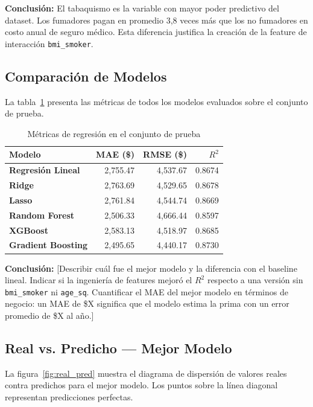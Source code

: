 \documentclass[12pt, a4paper]{article}
\begin{document}
\noindent\textbf{Conclusión:} El tabaquismo es la variable con mayor
poder predictivo del dataset. Los fumadores pagan en promedio 3{,}8 veces
más que los no fumadores en costo anual de seguro médico. Esta diferencia
justifica la creación de la feature de interacción \texttt{bmi\_smoker}.

\subsection{Comparación de Modelos}

La tabla~\ref{tab:resultados} presenta las métricas de todos los modelos
evaluados sobre el conjunto de prueba.

\begin{table}[H]
\centering
\caption{Métricas de regresión en el conjunto de prueba}
\small
\begin{tabular}{>{\bfseries}p{4.2cm} r r r}
\toprule
Modelo & MAE (\$) & RMSE (\$) & $R^2$ \\
\midrule
Regresión Lineal  & 2,755.47 & 4,537.67 & 0.8674 \\
Ridge             & 2,763.69 & 4,529.65 & 0.8678 \\
Lasso             & 2,761.84 & 4,544.74 & 0.8669 \\
Random Forest     & 2,506.33 & 4,666.44 & 0.8597 \\
XGBoost           & 2,583.13 & 4,518.97 & 0.8685 \\
Gradient Boosting & 2,495.65 & 4,440.17 & 0.8730 \\
\bottomrule
\end{tabular}
\label{tab:resultados}
\end{table}

\noindent\textbf{Conclusión:} [Describir cuál fue el mejor modelo y la
diferencia con el baseline lineal. Indicar si la ingeniería de features
mejoró el $R^2$ respecto a una versión sin \texttt{bmi\_smoker} ni
\texttt{age\_sq}. Cuantificar el MAE del mejor modelo en términos de
negocio: un MAE de \$X significa que el modelo estima la prima con un
error promedio de \$X al año.]

\subsection{Real vs. Predicho — Mejor Modelo}

La figura~\ref{fig:real_pred} muestra el diagrama de dispersión de
valores reales contra predichos para el mejor modelo. Los puntos sobre
la línea diagonal representan predicciones perfectas.
\end{document}
